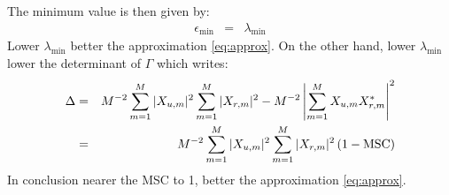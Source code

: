 The minimum value is then given by:
\begin{eqnarray*}
 \epsilon_{\min}&=&\lambda_{\min}
\end{eqnarray*}
Lower  $\lambda_{\min}$ better the approximation \eqref{eq:approx}. On the other hand, lower  $\lambda_{\min}$ lower the determinant of $\Gamma$ which writes:
\begin{eqnarray*}
 \Delta & =& M^{-2}\sum_{m=1}^M |X_{{u},m}|^2\sum_{m=1}^M |X_{{r},m}|^2-
  M^{-2}\left| \sum_{m=1}^M X_{{u},m}X_{{r},m}^* \right|^2
 \\
&=& M^{-2}\sum_{m=1}^M |X_{{u},m}|^2\sum_{m=1}^M |X_{{r},m}|^2\,
(1-\mathrm{MSC})
\end{eqnarray*}
In conclusion nearer the MSC to 1, better the approximation \eqref{eq:approx}.

